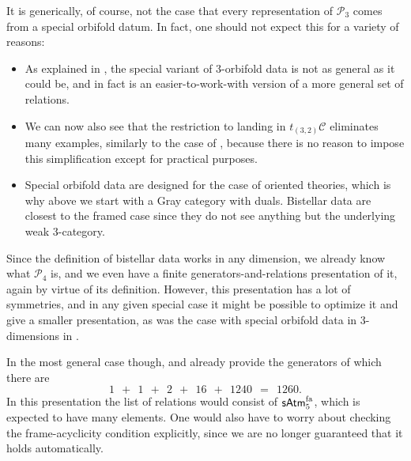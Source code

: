 \documentclass[12pt,a4paper]{article}
\numberwithin{equation}{section}
\newcommand{\atm}[2][s]{%
    \ifx b#1\mathsf{Atm}_{#2}\else
    \ifx s#1\mathsf{sAtm}_{#2}\else
    \ifx f#1\mathsf{sAtm}^{\mathrm{fa}}_{#2}\else
    \mathrm{Illegal~option}%
    \fi\fi\fi
}
\begin{document}
\begin{remark}
    It is generically, of course, not the case that every representation of $\mathscr{P}_3$ comes from a special orbifold datum. In fact, one should not expect this for a variety of reasons:
    \begin{itemize}
        \item As explained in \cite{orbifoldnd}, the special variant of 3-orbifold data is not as general as it could be, and in fact is an easier-to-work-with version of a more general set of relations.
        \item We can now also see that the restriction to landing in $t_{(3,2)} \mathscr{C}$ eliminates many examples, similarly to the case of , because there is no reason to impose this simplification except for practical purposes.
        \item Special orbifold data are designed for the case of oriented theories, which is why above we start with a Gray category with duals. Bistellar data are closest to the framed case since they do not see anything but the underlying weak $3$-category.
    \end{itemize}
\end{remark}

\begin{remark}
    Since the definition of bistellar data works in any dimension, we already know what $\mathscr{P}_4$ is, and we even have a finite generators-and-relations presentation of it, again by virtue of its definition. However, this presentation has a lot of symmetries, and in any given special case it might be possible to optimize it and give a smaller presentation, as was the case with special orbifold data in 3-dimensions in .
    
    In the most general case though,  and  already provide the generators of which there are
    \begin{equation}
        1 \ \  + \ \  1 \ \  + \ \  2 \ \  + \ \  16 \ \  + \ \  1240 \ \  = \ \  1260.
    \end{equation}
    In this presentation the list of relations would consist of $\atm{5}^{\mathrm{fa}}$, which is expected to have many elements. One would also have to worry about checking the frame-acyclicity condition explicitly, since we are no longer guaranteed that it holds automatically.
\end{remark}
\end{document}
